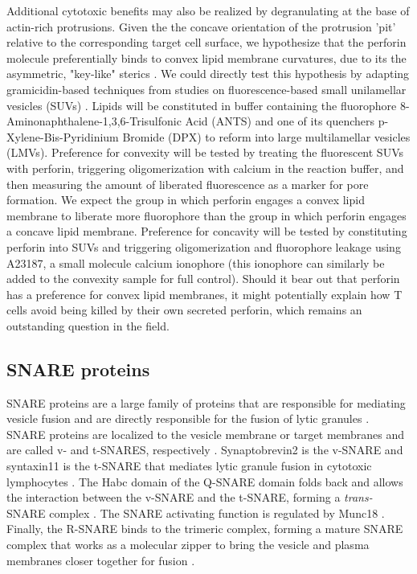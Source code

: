 Additional cytotoxic benefits may also be realized by degranulating at the base of actin-rich protrusions. Given the the concave orientation of the protrusion 'pit' relative to the corresponding target cell surface, we hypothesize that the perforin molecule preferentially binds to convex lipid membrane curvatures, due to its the  asymmetric, "key-like" sterics \cite{Law2010}. We could directly test this hypothesis by adapting gramicidin-based techniques from studies on fluorescence-based small unilamellar vesicles (SUVs) \cite{Ingolfsson2010,  Polozov2001}. Lipids will be constituted in buffer containing the fluorophore 8-Aminonaphthalene-1,3,6-Trisulfonic Acid (ANTS) and one of its quenchers p-Xylene-Bis-Pyridinium Bromide (DPX) to reform into large multilamellar vesicles (LMVs). Preference for convexity will be tested by treating the fluorescent SUVs with perforin, triggering oligomerization with calcium in the reaction buffer, and then measuring the amount of liberated fluorescence as a marker for pore formation. We expect the group in which perforin engages a convex lipid membrane to liberate more fluorophore than the group in which perforin engages a concave lipid membrane. Preference for concavity will be tested by constituting perforin into SUVs and triggering oligomerization and fluorophore leakage using A23187, a small molecule calcium ionophore (this ionophore can similarly be added to the convexity sample for full control).  Should it bear out that perforin has a preference for convex lipid membranes, it might potentially explain how T cells avoid being killed by their own secreted perforin, which remains an outstanding question in the field.

\subsection{SNARE proteins}
SNARE proteins are a large family of proteins that are responsible for mediating vesicle fusion and are directly responsible for the fusion of lytic granules \cite{Chang2017}.  SNARE proteins are localized to the vesicle membrane or target membranes and are called v- and t-SNARES, respectively \cite{Yoon2018}. Synaptobrevin2 is the v-SNARE and syntaxin11 is the t-SNARE that mediates lytic granule fusion in cytotoxic lymphocytes \cite{Halimani2014, Chitirala2019, Matti2013}. The Habc domain of the Q-SNARE domain folds back and allows the interaction between the v-SNARE and the t-SNARE, forming a \textit{trans-}SNARE complex \cite{Yoon2018}.  The SNARE activating function is regulated by Munc18 \cite{Spessott2017, Yoon2018, Baker2015}. Finally, the R-SNARE binds to the trimeric complex, forming a mature SNARE complex that works as a molecular zipper to bring the vesicle and plasma membranes closer together for fusion \cite{Agostino2017}.

